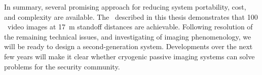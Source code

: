 In summary, several promising approach for reducing system portability, cost, and complexity are available.
The \Imager\ described in this thesis demonstrates that \SI{100}{\mK} \NETD\ video images at \SI{17}{\m} standoff distances are achievable.
Following resolution of the remaining technical issues, and investigating of imaging phenomenology, we will be ready to design a second-generation system.
Developments over the next few years will make it clear whether cryogenic passive imaging systems can solve problems for the security community.

